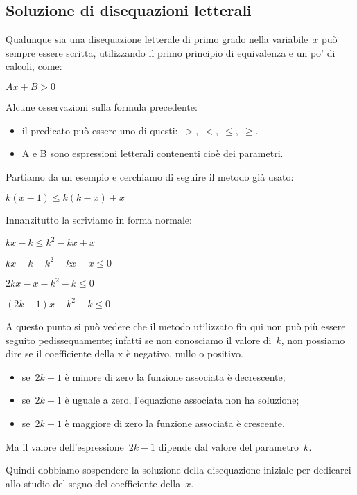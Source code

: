 \subsection{Soluzione di disequazioni letterali}
\label{sec:dis_tetterali}

Qualunque sia una disequazione letterale di primo grado nella variabile~$x$ 
può sempre essere scritta, utilizzando il primo principio di equivalenza e un 
po' di calcoli, come:

$A x + B > 0$

Alcune osservazioni sulla formula precedente:

\begin{itemize}
 \item il predicato può essere uno di questi:~$>, \; <, \; \le, \; \ge$.
 \item A e B sono espressioni letterali contenenti cioè dei parametri.
\end{itemize}

Partiamo da un  esempio e cerchiamo di seguire il metodo già usato:

$k \left( x -1 \right )\le k \left ( k - x \right ) + x$

Innanzitutto la scriviamo in forma normale:

$k x - k \le k^2 - k x + x $

$k x - k - k^2 + k x - x \le 0 $

$2 k x - x - k^2 - k \le 0 $

$\left (2 k - 1 \right ) x - k^2 - k \le 0$

A questo punto si può vedere che il metodo utilizzato fin qui non può più 
essere seguito pedissequamente; infatti se non conosciamo il valore di~$k$,
non possiamo dire se il coefficiente della x è negativo, nullo o positivo.

\begin{itemize}
 \item se~$2 k - 1$ è minore di zero la funzione associata è decrescente;
 \item se~$2 k - 1$ è uguale a zero, l'equazione associata non ha soluzione;
 \item se~$2 k - 1$ è maggiore di zero la funzione associata è crescente.
\end{itemize}

Ma il valore dell'espressione~$2 k - 1$ dipende dal valore del 
parametro~$k$. 

Quindi dobbiamo sospendere la soluzione della disequazione iniziale per 
dedicarci allo studio del segno del coefficiente della~$x$. 

